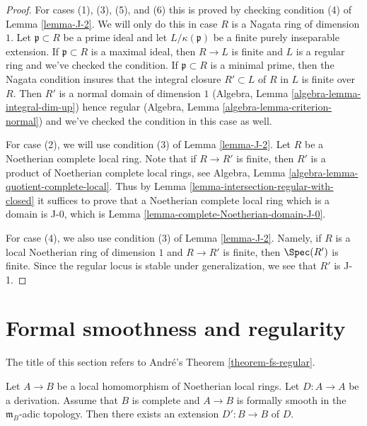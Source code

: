 \begin{proof}
For cases (1), (3), (5), and (6) this is proved by checking
condition (4) of Lemma \ref{lemma-J-2}. We will only do this
in case $R$ is a Nagata ring of dimension $1$. Let $\mathfrak p \subset R$
be a prime ideal and let $L/\kappa(\mathfrak p)$ be a finite
purely inseparable extension. If $\mathfrak p \subset R$ is a
maximal ideal, then $R \to L$ is finite and $L$ is a regular ring
and we've checked the condition. If $\mathfrak p \subset R$ is a
minimal prime, then the Nagata condition insures that the
integral closure $R' \subset L$ of $R$ in $L$ is finite over $R$.
Then $R'$ is a normal domain of dimension $1$
(Algebra, Lemma \ref{algebra-lemma-integral-dim-up})
hence regular (Algebra, Lemma \ref{algebra-lemma-criterion-normal})
and we've checked the condition in this case as well.

\medskip\noindent
For case (2), we will use condition (3) of Lemma \ref{lemma-J-2}.
Let $R$ be a Noetherian complete local ring.
Note that if $R \to R'$ is finite, then $R'$ is a product of
Noetherian complete local rings, see
Algebra, Lemma \ref{algebra-lemma-quotient-complete-local}.
Thus by Lemma \ref{lemma-intersection-regular-with-closed} it
suffices to prove that a Noetherian complete local ring
which is a domain is J-0, which is
Lemma \ref{lemma-complete-Noetherian-domain-J-0}.

\medskip\noindent
For case (4), we also use condition (3) of Lemma \ref{lemma-J-2}.
Namely, if $R$ is a local Noetherian ring of dimension $1$ and
$R \to R'$ is finite, then $\Spec(R')$ is finite. Since the
regular locus is stable under generalization, we see
that $R'$ is J-1.
\end{proof}





\section{Formal smoothness and regularity}
\label{section-fs-regular}

\noindent
The title of this section refers to Andr\'e's Theorem \ref{theorem-fs-regular}.

\begin{lemma}
\label{lemma-lift-derivation-through-fs}
Let $A \to B$ be a local homomorphism of Noetherian local rings.
Let $D : A \to A$ be a derivation. Assume that $B$ is complete
and $A \to B$ is formally smooth in the $\mathfrak m_B$-adic topology.
Then there exists an extension $D' : B \to B$ of $D$.
\end{lemma}

